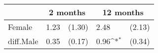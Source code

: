 {
\def\sym#1{\ifmmode^{#1}\else\(^{#1}\)\fi}
\begin{tabular*}{.65\hsize}{@{\hskip\tabcolsep\extracolsep\fill}l*{2}{lc}}
\toprule
                &\multicolumn{2}{c}{2 months}&\multicolumn{2}{c}{12 months}\\
\midrule
Female\hspace{2cm}&     1.23         &   (1.30)&     2.48         &   (2.13)\\
diff.Male\hspace{2cm}&     0.35         &   (0.17)&     0.96\sym{*}  &   (0.34)\\
\bottomrule
\end{tabular*}
}
